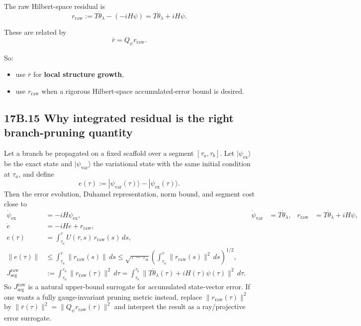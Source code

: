 \documentclass[11pt]{article}
\begin{document}
The raw Hilbert-space residual is
\[
r_{\mathrm{raw}}
:=
T\dot\theta_\lambda-(-iH\psi)
=
T\dot\theta_\lambda+iH\psi.
\]

These are related by
\[
\bar r=Q_\psi r_{\mathrm{raw}}.
\]

So:

\begin{itemize}
\item use $\bar r$ for \textbf{local structure growth},
\item use $r_{\mathrm{raw}}$ when a rigorous Hilbert-space accumulated-error bound is desired.

\end{itemize}

\subsection*{17B.15 Why integrated residual is the right branch-pruning quantity}


Let a branch be propagated on a fixed scaffold over a segment $[\tau_a,\tau_b]$. Let $|\psi_{\mathrm{ex}}\rangle$ be the exact state and $|\psi_{\mathrm{var}}\rangle$ the variational state with the same initial condition at $\tau_a$, and define
\[
e(\tau):=|\psi_{\mathrm{var}}(\tau)\rangle-|\psi_{\mathrm{ex}}(\tau)\rangle.
\]
Then the error evolution, Duhamel representation, norm bound, and segment cost close to
\[
\begin{aligned}
\dot\psi_{\mathrm{ex}}&=-iH\psi_{\mathrm{ex}},&
\dot\psi_{\mathrm{var}}&=T\dot\theta_\lambda,&
r_{\mathrm{raw}}&=T\dot\theta_\lambda+iH\psi,\\
\dot e&=-iHe+r_{\mathrm{raw}},\\
e(\tau)&=\int_{\tau_a}^\tau U(\tau,s)\,r_{\mathrm{raw}}(s)\,ds,\\
\|e(\tau)\|&\le\int_{\tau_a}^\tau\|r_{\mathrm{raw}}(s)\|\,ds\le\sqrt{\tau-\tau_a}\left(\int_{\tau_a}^\tau\|r_{\mathrm{raw}}(s)\|^2\,ds\right)^{1/2},\\
J_{\mathrm{seg}}^{\mathrm{raw}}&:=\int_{\tau_a}^{\tau_b}\|r_{\mathrm{raw}}(\tau)\|^2\,d\tau=\int_{\tau_a}^{\tau_b}\|T\dot\theta_\lambda(\tau)+iH(\tau)\psi(\tau)\|^2\,d\tau.
\end{aligned}
\]
So $J_{\mathrm{seg}}^{\mathrm{raw}}$ is a natural upper-bound surrogate for accumulated state-vector error. If one wants a fully gauge-invariant pruning metric instead, replace $\|r_{\mathrm{raw}}(\tau)\|^2$ by $\|\bar r(\tau)\|^2=\|Q_\psi r_{\mathrm{raw}}(\tau)\|^2$ and interpret the result as a ray/projective error surrogate.
\end{document}

